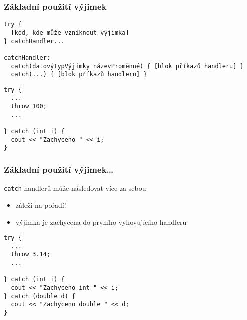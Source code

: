 \begin{frame}[fragile]
\frametitle{Základní použití výjimek}
\begin{noteblock}{}
\begin{lstlisting}[basicstyle=\small]
try {
  [kód, kde může vzniknout výjimka]
} catchHandler...

catchHandler:
  catch(datovýTypVýjimky názevProměnné) { [blok příkazů handleru] }
  catch(...) { [blok příkazů handleru] }
\end{lstlisting}
\end{noteblock}

\begin{yesblock}
\begin{lstlisting}[basicstyle=\small]
try {
  ...
  throw 100;
  ...

} catch (int i) {
  cout << "Zachyceno " << i;
}
\end{lstlisting}
\end{yesblock}
\end{frame}



\begin{frame}[fragile]
\frametitle{Základní použití výjimek\ldots}
\begin{bitemize}
\item \lstinline|catch| handlerů může následovat více za sebou
\begin{itemize}
\item záleží na pořadí!
\item výjimka je zachycena do prvního vyhovujícího handleru
\end{itemize}
\end{bitemize}
\begin{yesblock}
\begin{lstlisting}
try {
  ...
  throw 3.14;
  ...

} catch (int i) {
  cout << "Zachyceno int " << i;
} catch (double d) {
  cout << "Zachyceno double " << d;
}
\end{lstlisting}
\end{yesblock}
\end{frame}





